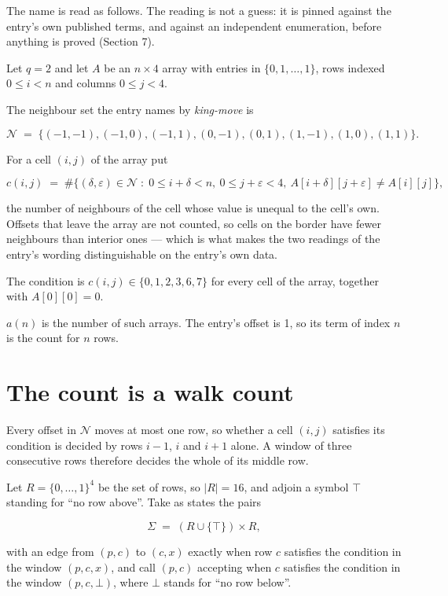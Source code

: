 \documentclass[11pt]{article}
\theoremstyle{definition}
\begin{document}
The name is read as follows. The reading is not a guess: it is pinned against the entry's own published terms, and against an independent enumeration, before anything is proved (Section 7).

Let $q = 2$ and let $A$ be an $n \times 4$ array with entries in $\{0,1,\dots,1\}$, rows indexed $0 \le i < n$ and columns $0 \le j < 4$.

The neighbour set the entry names by {\itshape king-move} is

\[\mathcal{N} \;=\; \{(-1,-1), (-1,0), (-1,1), (0,-1), (0,1), (1,-1), (1,0), (1,1)\}.\]

For a cell $(i,j)$ of the array put

\[c(i,j) \;=\; \#\bigl\{(\delta,\varepsilon)\in\mathcal{N} \;:\; 0\le i+\delta<n,\ 0\le j+\varepsilon<4,\ A[i+\delta][j+\varepsilon] \neq A[i][j]\bigr\},\]

the number of neighbours of the cell whose value is unequal to the cell's own. Offsets that leave the array are not counted, so cells on the border have fewer neighbours than interior ones --- which is what makes the two readings of the entry's wording distinguishable on the entry's own data.

The condition is $c(i,j) \in \{0, 1, 2, 3, 6, 7\}$ for every cell of the array, together with $A[0][0]=0$.

$a(n)$ is the number of such arrays. The entry's offset is 1, so its term of index $n$ is the count for $n$ rows.

\section{The count is a walk count}

Every offset in $\mathcal{N}$ moves at most one row, so whether a cell $(i,j)$ satisfies its condition is decided by rows $i-1$, $i$ and $i+1$ alone. A window of three consecutive rows therefore decides the whole of its middle row.

Let $R = \{0,\dots,1\}^{4}$ be the set of rows, so $|R| = 16$, and adjoin a symbol $\top$ standing for ``no row above''. Take as states the pairs

\[\Sigma \;=\; (R \cup \{\top\}) \times R,\]

with an edge from $(p,c)$ to $(c,x)$ exactly when row $c$ satisfies the condition in the window $(p,c,x)$, and call $(p,c)$ accepting when $c$ satisfies the condition in the window $(p,c,\bot)$, where $\bot$ stands for ``no row below''.
\end{document}
